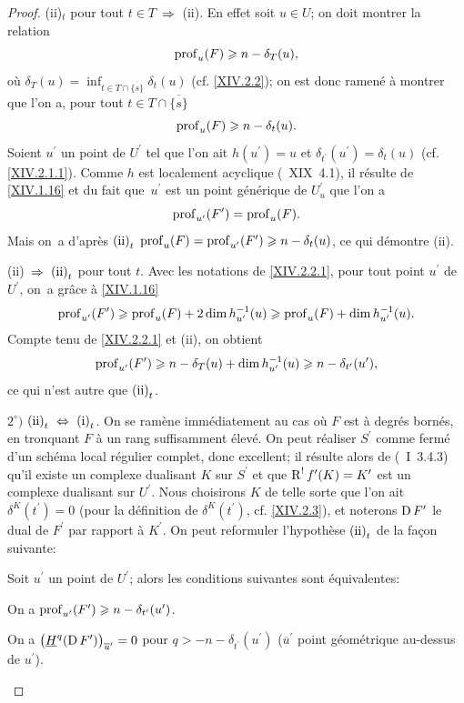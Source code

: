 \begin{proof}
\textup{(ii)}$_{t}$ pour tout $t\in T$~$\To$~\textup{(ii)}. En effet soit $u\in U$; on doit montrer la relation
$$
\operatorname{prof}_{u}(F)\geqslant n-\delta_{T}(u),
$$
o\`u $\delta_{T}(u)=\inf_{t\in T\cap\overline{\{ s\} }}\delta_{t}(u)$ (cf. \ref{XIV.2.2}); on est donc ramen\'e \`a montrer que l'on a, pour tout $t\in T\cap\overline{\{ s\} }$
$$
\operatorname{prof}_{u}(F)\geqslant n-\delta_{t}(u).
$$
Soient $u^{\prime}$ un point de $U^{\prime}$ tel que l'on ait $h(u^{\prime})=u$ et $\delta_{t^{\prime}}(u^{\prime})=\delta_{t}(u)$ (cf. \ref{XIV.2.1.1}). Comme $h$ est localement acyclique (~XIX~4.1), il r\'esulte de \ref{XIV.1.16} et du fait que~$u^{\prime}$ est un point g\'en\'erique de $U_{u}^{\prime}$ que l'on a
$$
\operatorname{prof}_{u^{\prime}}(F^{\prime})=\operatorname{prof}_{u}(F).
$$
Mais on~a d'apr\`es $\textup{(ii)}_{t}$ $\operatorname{prof}_{u}(F)=\operatorname{prof}_{u^{\prime}}(F^{\prime})\geqslant n-\delta_{t}(u)$, ce qui d\'emontre \textup{(ii)}.

\textup{(ii)}~$\To$~$\textup{(ii)}_{t}$ pour tout $t$. Avec les notations de \ref{XIV.2.2.1}, pour tout point $u^{\prime}$ de $U^{\prime}$, on~a gr\^ace \`a \ref{XIV.1.16}
$$
\operatorname{prof}_{u^{\prime}}(F^{\prime})\geqslant\operatorname{prof}_{u}(F)+2\dim h_{u^{\prime}}^{-1}(u)\geqslant\operatorname{prof}_{u}(F)+\dim h_{u^{\prime}}^{-1}(u).
$$
Compte tenu de \ref{XIV.2.2.1} et \textup{(ii)}, on obtient
$$
\operatorname{prof}_{u^{\prime}}(F^{\prime})\geqslant n-\delta_{T}(u)+\dim h_{u^{\prime}}^{-1}(u)\geqslant n-\delta_{t^{\prime}}(u^{\prime}),
$$
ce qui n'est autre que $\textup{(ii)}_{t}$.

$2^\circ)$ $\textup{(ii)}_{t}$~$\Ssi$~$\textup{(i)}_{t}$. On se ram\`ene imm\'ediatement au cas o\`u $F$ est \`a degr\'es born\'es, en tronquant $F$ \`a un rang suffisamment \'elev\'e. On peut r\'ealiser $S^{\prime}$ comme ferm\'e d'un sch\'ema local r\'egulier complet, donc excellent; il r\'esulte alors de (~I~3.4.3) qu'il existe un complexe dualisant $K$ sur $S^{\prime}$ et que $\operatorname{R}^{!}f^{\prime}(K)=K^{\prime}$ est un complexe dualisant sur $U^{\prime}$. Nous choisirons $K$ de telle sorte que l'on ait $\delta^{K}(t^{\prime})=0$ (pour la d\'efinition de $\delta^{K}(t^{\prime})$, cf. \ref{XIV.2.3}), et noterons $\operatorname{D} F^{\prime}$ le dual de $F^{\prime}$ par rapport \`a $K^{\prime}$. On peut reformuler l'hypoth\`ese $\textup{(ii)}_{t}$ de la fa\c con suivante:

\begin{sublemme} \label{XIV.4.2.2}
Soit $u^{\prime}$ un point de $U^{\prime}$; alors les conditions suivantes sont \'equivalentes:
\begin{enumeratei}
\item
On a $\operatorname{prof}_{u^{\prime}}(F^{\prime})\geqslant n-\delta_{t^{\prime}}(u^{\prime})$.
\item
On a $\big(\underline{H}^{q}(\operatorname{D} F^{\prime}) \big)_{\overline{u}^{\prime}}=0$ pour $q>-n-\delta_{t^{\prime}}(u^{\prime})$ ($\overline{u}^{\prime}$ point g\'eom\'etrique au-dessus de $u^{\prime}$).
\end{enumeratei}
\end{sublemme}


\end{proof}

